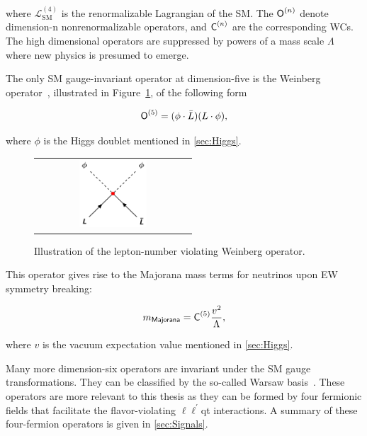 where $\mathcal{L}_{\text{SM}}^{(4)}$ is the renormalizable Lagrangian of the \ac{SM}. The $\textsf{O}^{(n)}_{}$ denote dimension-n nonrenormalizable operators, and $\textsf{C}^{(n)}_{}$ are the corresponding \acp{WC}. The high dimensional operators are suppressed by powers of a mass scale $\Lambda$ where new physics is presumed to emerge. 

The only \ac{SM} gauge-invariant operator at dimension-five is the Weinberg operator~\cite{Weinberg:1979sa}, illustrated in Figure~\ref{fig:Dim5}, of the following form

\begin{equation}
\textsf{O}^{(5)}_{}=(\phi\cdot\bar{L})(L\cdot\phi),
\end{equation}

where $\phi$ is the Higgs doublet mentioned in \autoref{sec:Higgs}. 

\begin{figure}[tbh!]
 \begin{center}
 \begin{tabular}{c}
 \includegraphics[width=0.45\textwidth]{figures/Part1/EFT/Dim5}
 \end{tabular}
 \caption{Illustration of the lepton-number violating Weinberg operator.}
 \label{fig:Dim5}
 \end{center}
\end{figure}

This operator gives rise to the Majorana mass terms for neutrinos upon \ac{EW} symmetry breaking:

\begin{equation}
m_{\textsf{Majorana}}=\textsf{C}^{(5)}_{}\frac{v^2}{\mathrm{\Lambda}},
\end{equation}

where $v$ is the vacuum expectation value mentioned in \autoref{sec:Higgs}.

Many more dimension-six operators are invariant under the \ac{SM} gauge transformations. They can be classified by the so-called Warsaw basis~\cite{Grzadkowski:2010es}. These operators are more relevant to this thesis as they can be formed by four fermionic fields that facilitate the flavor-violating $\ell\ell^{\prime}$qt interactions. A summary of these four-fermion operators is given in \autoref{sec:Signals}.